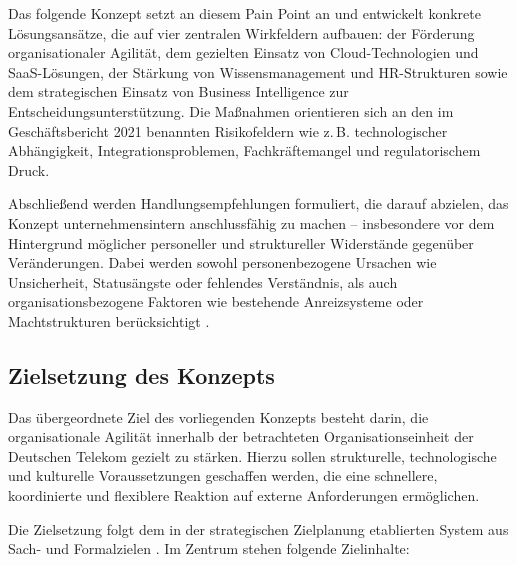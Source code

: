 \documentclass[12pt,a4paper]{article}
\begin{document}
	\noindent Das folgende Konzept setzt an diesem Pain Point an und entwickelt konkrete Lösungsansätze, die auf vier zentralen Wirkfeldern aufbauen: der Förderung organisationaler Agilität, dem gezielten Einsatz von Cloud-Technologien und SaaS-Lösungen, der Stärkung von Wissensmanagement und HR-Strukturen sowie dem strategischen Einsatz von Business Intelligence zur Entscheidungsunterstützung. Die Maßnahmen orientieren sich an den im Geschäftsbericht 2021 benannten Risikofeldern wie z.\,B. technologischer Abhängigkeit, Integrationsproblemen, Fachkräftemangel und regulatorischem Druck.
	
	\noindent Abschließend werden Handlungsempfehlungen formuliert, die darauf abzielen, das Konzept unternehmensintern anschlussfähig zu machen – insbesondere vor dem Hintergrund möglicher personeller und struktureller Widerstände gegenüber Veränderungen. Dabei werden sowohl personenbezogene Ursachen wie Unsicherheit, Statusängste oder fehlendes Verständnis, als auch organisationsbezogene Faktoren wie bestehende Anreizsysteme oder Machtstrukturen berücksichtigt \parencite{schmelzerHermannJ2020GidP}.
	
	
\subsection{Zielsetzung des Konzepts}

Das übergeordnete Ziel des vorliegenden Konzepts besteht darin, die organisationale Agilität innerhalb der betrachteten Organisationseinheit der Deutschen Telekom gezielt zu stärken. Hierzu sollen strukturelle, technologische und kulturelle Voraussetzungen geschaffen werden, die eine schnellere, koordinierte und flexiblere Reaktion auf externe Anforderungen ermöglichen.

\noindent Die Zielsetzung folgt dem in der strategischen Zielplanung etablierten System aus Sach- und Formalzielen \parencite{StelzerDirk1962-2011I:GA}. Im Zentrum stehen folgende Zielinhalte:
\end{document}
